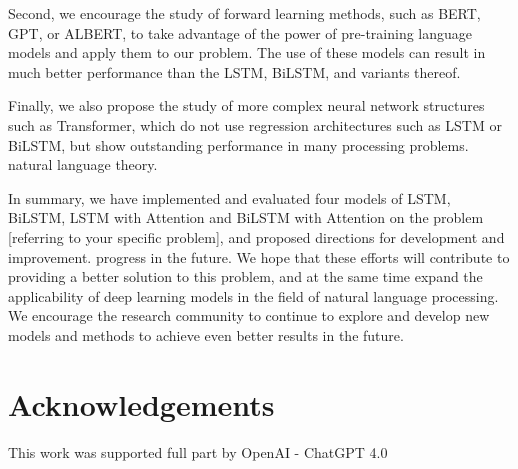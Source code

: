\documentclass[11pt]{article}
\begin{document}
Second, we encourage the study of forward learning methods, such as BERT, GPT, or ALBERT, to take advantage of the power of pre-training language models and apply them to our problem. The use of these models can result in much better performance than the LSTM, BiLSTM, and variants thereof.

Finally, we also propose the study of more complex neural network structures such as Transformer, which do not use regression architectures such as LSTM or BiLSTM, but show outstanding performance in many processing problems. natural language theory.

In summary, we have implemented and evaluated four models of LSTM, BiLSTM, LSTM with Attention and BiLSTM with Attention on the problem [referring to your specific problem], and proposed directions for development and improvement. progress in the future. We hope that these efforts will contribute to providing a better solution to this problem, and at the same time expand the applicability of deep learning models in the field of natural language processing. We encourage the research community to continue to explore and develop new models and methods to achieve even better results in the future.

\section{Acknowledgements}
This work was supported full part by OpenAI - ChatGPT 4.0



\\




















\appendix
\end{document}
